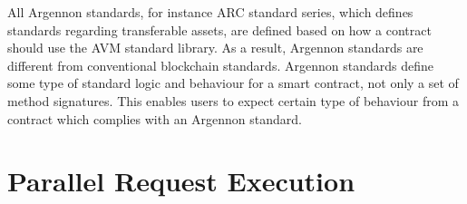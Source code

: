 All Argennon standards, for instance ARC standard series, which defines standards regarding transferable assets,
are defined based on how a contract should use the AVM standard library. As a result, Argennon standards are
different from conventional blockchain standards. Argennon standards define some type of standard logic and
behaviour for a smart contract, not only a set of method signatures. This enables users to expect certain type
of behaviour from a contract which complies with an Argennon standard.


\section{Parallel Request Execution}\label{sec:concurrency}
